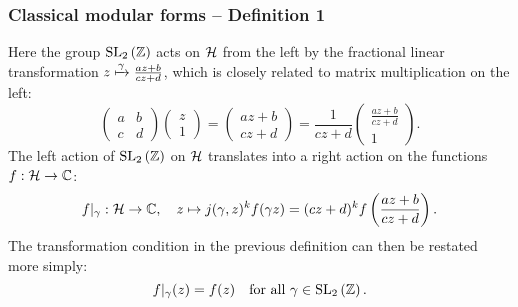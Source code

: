 \begin{frame} \frametitle{Classical modular forms -- Definition 1}
  Here the group $\SL[2]{\ZZ}$ acts on $\HH$ from the left by the fractional linear transformation $z \xmapsto{\gamma} \frac{az+b}{cz+d}$, which is closely related to matrix multiplication on the left:
  \[ \begin{pmatrix} a & b \\ c & d \end{pmatrix} \begin{pmatrix} z \\ 1 \end{pmatrix} = \begin{pmatrix} az+b \\ cz+d \end{pmatrix} = \frac{1}{cz+d} \begin{pmatrix} \frac{az+b}{cz+d} \\ 1 \end{pmatrix}. \]
  \pause
  The left action of $\SL[2]{\ZZ}$ on $\HH$ translates into a right action on the functions $f : \HH \to \CC$:
  \[ f|_\gamma : \HH \to \CC, \quad z \mapsto j(\gamma,z)^k f(\gamma z) = (cz+d)^k f\parens{\frac{az+b}{cz+d}}. \]
  \pause
  The transformation condition in the previous definition can then be restated more simply: \pause
  \[ f|_\gamma(z) = f(z) \lsptext{for all} \gamma \in \SL[2]{\ZZ}. \]
\end{frame}



